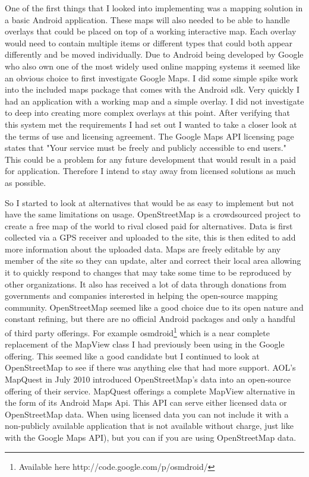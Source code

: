 \documentclass[11pt,fleqn,twoside]{article}
\begin{document}
One of the first things that I looked into implementing was a mapping solution in a basic Android application. These maps will also needed to be able to handle overlays that could be placed on top of a working interactive map. Each overlay would need to contain multiple items or different types that could both appear differently and be moved individually. Due to Android being developed by Google who also own one of the most widely used online mapping systems it seemed like an obvious choice to first investigate Google Maps. I did some simple spike work into the included maps package that comes with the Android \gls{sdk}. Very quickly I had an application with a working map and a simple overlay. I did not investigate to deep into creating more complex overlays at this point. After verifying that this system met the requirements I had set out I wanted to take a closer look at the terms of use and licensing agreement. The Google Maps API licensing page \cite{google_map_license} states that "Your service must be freely and publicly accessible to end users." This could be a problem for any future development that would result in a paid for application. Therefore I intend to stay away from licensed solutions as much as possible.

So I started to look at alternatives that would be as easy to implement but not have the same limitations on usage. OpenStreetMap is a crowdsourced project to create a free map of the world to rival closed paid for alternatives. Data is first collected via a GPS receiver and uploaded to the site, this is then edited to add more information about the uploaded data. Maps are freely editable by any member of the site so they can update, alter and correct their local area allowing it to quickly respond to changes that may take some time to be reproduced by other organizations. It also has received a lot of data through donations from governments and companies interested in helping the open-source mapping community. OpenStreetMap seemed like a good choice due to its open nature and constant refining, but there are no official Android packages and only a handful of third party offerings. For example osmdroid\footnote{Available here http://code.google.com/p/osmdroid/} which is a near complete replacement of the MapView class I had previously been using in the Google offering. This seemed like a good candidate but I continued to look at OpenStreetMap to see if there was anything else that had more support. AOL's MapQuest in July 2010 introduced OpenStreetMap's data into an open-source offering of their service. MapQuest offerings a complete MapView alternative in the form of its Android Maps Api\cite{mapquest}. This API can serve either licensed data or OpenStreetMap data. When using licensed data you can not include it with a non-publicly available application that is not available without charge, just like with the Google Maps API), but you can if you are using OpenStreetMap data.
\end{document}
